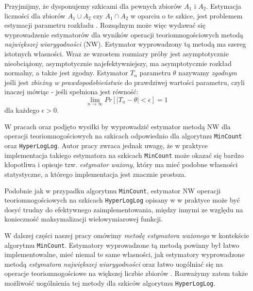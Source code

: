        Przyjmijmy, że dysponujemy szkicami dla pewnych zbiorów $A_1$ i $A_2$. Estymacja liczności dla zbiorów $A_1 \cup A_2$ czy 
       $A_1 \cap A_2$ w oparciu o te szkice, jest problemem estymacji parametru rozkładu \cite{ting}. Rozsądnym może więc wydawać się wyprowadzenie estymatorów dla wyników operacji teoriomnogościowych metodą \textit{największej wiarygodności} (NW).
       Estymator wyprowadzony tą metodą ma szereg istotnych własności. Wraz ze wzrostem rozmiary próby jest asymptotycznie nieobciążony, asymptotycznie najefektywniejszy, ma asymptotycznie rozkład normalny, a także jest zgodny. Estymator $T_n$ parametru $\theta$ nazywamy \textit{zgodnym} jeśli jest \textit{zbieżny w prawdopodobieństwie}  do prawdziwej wartości parametru, czyli inaczej mówiąc - jeśli spełniona jest równość:
       \begin{equation}
     		\lim_{n \to \infty} Pr[|T_n - \theta| < \epsilon] = 1
     		\label{consistent_def}
       \end{equation}
       dla każdego $\epsilon > 0$.
%       
      
      W pracach \cite{ting} oraz \cite{oertl} podjęto wysiłki
      by wyprowadzić estymator metodą NW dla operacji teoriomnogościowych na szkicach odpowiednio dla algorytmu \texttt{MinCount} oraz \texttt{HyperLogLog}.
      Autor pracy \cite{ting} zwraca jednak uwagę, że
      w praktyce implementacja takiego estymatora na szkicach \texttt{MinCount} może okazać się bardzo kłopotliwa i opisuje tzw. \textit{estymator ważony}, który ma  mieć podobne własności statystyczne, a którego implementacja jest znacznie prostsza. 
  
 Podobnie jak w przypadku algorytmu \texttt{MinCount}, estymator NW operacji teoriomnogościowych na szkicach \texttt{HyperLogLog} opisany w 
 \cite{oertl} w praktyce może być dosyć trudny do efektywnego zaimplementowania, między innymi ze względu na konieczność maksymalizacji wielowymiarowej funkcji.
       
        W dalszej części naszej pracy omówimy  \textit{metodę estymatora ważonego} w kontekście algorytmu 
        \texttt{MinCount}. 
        Estymatory wyprowadzone tą metodą powinny był łatwo implementowalne, mieć niemal te same własności, jak estymatory wyprowadzone metodą \textit{estymatora największej wiarygodności} oraz łatwo uogólniać się na operacje teoriomnogościowe na większej liczbie zbiorów \cite{ting}.         
        Rozważymy zatem także  możliwość uogólnienia tej metody  dla szkiców algorytmu \texttt{HyperLogLog}.
        
        

       
       
       
